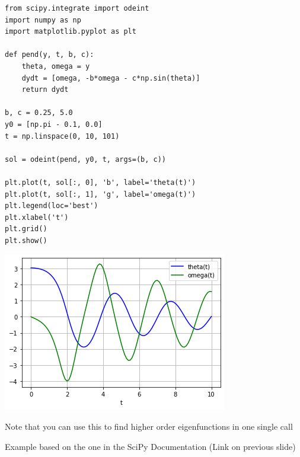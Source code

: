 
\begin{frame}[fragile]
%
\begin{codebox}[Example: Attenuated Pendulum, width=.57\linewidth, nobeforeafter, equal height group=grpODE]
\begin{verbatim}
from scipy.integrate import odeint
import numpy as np
import matplotlib.pyplot as plt

def pend(y, t, b, c):
    theta, omega = y
    dydt = [omega, -b*omega - c*np.sin(theta)]
    return dydt

b, c = 0.25, 5.0
y0 = [np.pi - 0.1, 0.0]
t = np.linspace(0, 10, 101)

sol = odeint(pend, y0, t, args=(b, c))

plt.plot(t, sol[:, 0], 'b', label='theta(t)')
plt.plot(t, sol[:, 1], 'g', label='omega(t)')
plt.legend(loc='best')
plt.xlabel('t')
plt.grid()
plt.show()
\end{verbatim}
\end{codebox}
%
\begin{tcolorbox}[title=Output, width=.42\linewidth, nobeforeafter, equal height group=grpODE]
	\includegraphics[width=\linewidth]{./gfx/sciPy-ODE}
	
	\vspace{6pt}
	Note that you can use this to find higher order eigenfunctions in one single call
	
	\vspace{6pt}
	Example based on the one in the SciPy Documentation (Link on previous slide)
\end{tcolorbox}
%
\end{frame}


